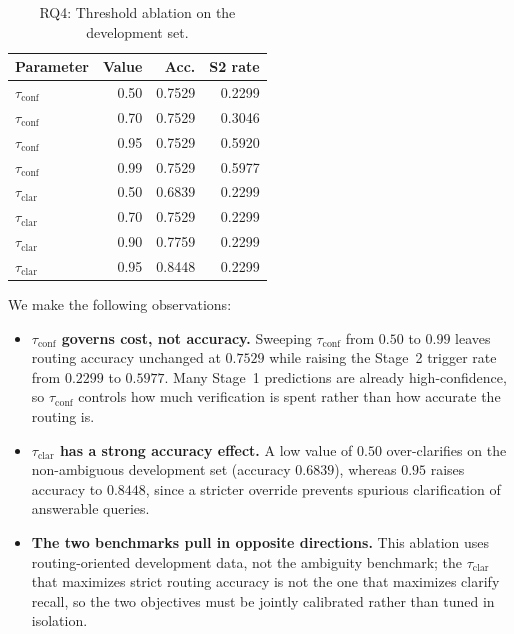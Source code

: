 ﻿\documentclass[11pt,twocolumn]{article}
\begin{document}
\begin{table}[!htbp]
\centering
\caption{RQ4: Threshold ablation on the development set.}
\label{tab:threshold_ablation}
\small
\setlength{\tabcolsep}{3.5pt}
\begin{tabular}{lrrr}
\toprule
\textbf{Parameter} & \textbf{Value} & \textbf{Acc.} & \textbf{S2 rate} \\
\midrule
$\tau_{\mathrm{conf}}$ & 0.50 & 0.7529 & 0.2299 \\
$\tau_{\mathrm{conf}}$ & 0.70 & 0.7529 & 0.3046 \\
$\tau_{\mathrm{conf}}$ & 0.95 & 0.7529 & 0.5920 \\
$\tau_{\mathrm{conf}}$ & 0.99 & 0.7529 & 0.5977 \\
\midrule
$\tau_{\mathrm{clar}}$ & 0.50 & 0.6839 & 0.2299 \\
$\tau_{\mathrm{clar}}$ & 0.70 & 0.7529 & 0.2299 \\
$\tau_{\mathrm{clar}}$ & 0.90 & 0.7759 & 0.2299 \\
$\tau_{\mathrm{clar}}$ & 0.95 & 0.8448 & 0.2299 \\
\bottomrule
\end{tabular}
\end{table}

We make the following observations:
\begin{itemize}
  \item \textbf{$\tau_{\mathrm{conf}}$ governs cost, not accuracy.}
  Sweeping $\tau_{\mathrm{conf}}$ from $0.50$ to $0.99$ leaves routing
  accuracy unchanged at $0.7529$ while raising the Stage~2 trigger rate
  from $0.2299$ to $0.5977$. Many Stage~1 predictions are already
  high-confidence, so $\tau_{\mathrm{conf}}$ controls how much
  verification is spent rather than how accurate the routing is.

  \item \textbf{$\tau_{\mathrm{clar}}$ has a strong accuracy effect.} A
  low value of $0.50$ over-clarifies on the non-ambiguous development set
  (accuracy $0.6839$), whereas $0.95$ raises accuracy to $0.8448$, since a
  stricter override prevents spurious clarification of answerable queries.

  \item \textbf{The two benchmarks pull in opposite directions.} This
  ablation uses routing-oriented development data, not the ambiguity
  benchmark; the $\tau_{\mathrm{clar}}$ that maximizes strict routing
  accuracy is not the one that maximizes clarify recall, so the two
  objectives must be jointly calibrated rather than tuned in isolation.
\end{itemize}
\end{document}
